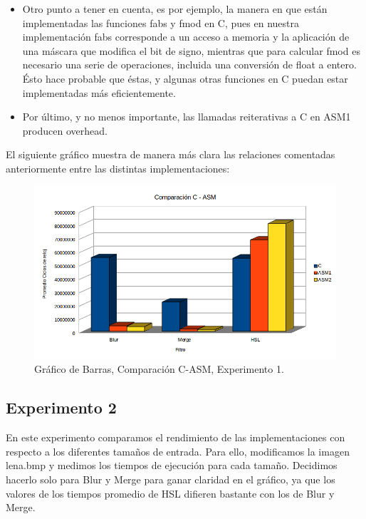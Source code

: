 \begin{itemize}
{\begin{itemize}
	\item {Otro punto a tener en cuenta, es por ejemplo, la manera en que están implementadas las funciones fabs y fmod en C, pues en nuestra implementación fabs corresponde a un acceso a memoria y la aplicación de una máscara que modifica el bit de signo, mientras que para calcular fmod es necesario una serie de operaciones, incluida una conversión de float a entero. Ésto hace probable que éstas, y algunas otras funciones en C puedan estar implementadas más eficientemente.}
	\item {Por último, y no menos importante, las llamadas reiterativas a C en ASM1 producen overhead.}
	\end{itemize}
	}
\end{itemize}	

El siguiente gráfico muestra de manera más clara las relaciones comentadas anteriormente entre las distintas implementaciones:

\begin{figure}[ht!]
\centering
\includegraphics[width=120mm]{imagenes/resultados/graficocomparacion.png}
\caption{Gráfico de Barras, Comparación C-ASM, Experimento 1.}
\end{figure}

\newpage


\subsection{Experimento 2}

En este experimento comparamos el rendimiento de las implementaciones con respecto a los diferentes tamaños de entrada. Para ello, modificamos la imagen lena.bmp y medimos los tiempos de ejecución para cada tamaño. Decidimos hacerlo solo para Blur y Merge para ganar claridad en el gráfico, ya que los valores de los tiempos promedio de HSL difieren bastante con los de Blur y Merge.


